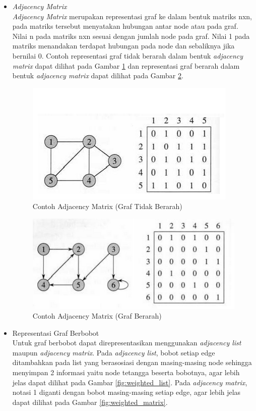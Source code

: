 \begin{itemize}
  \item \textit{Adjacency Matrix}\\
  \textit{Adjacency Matrix} merupakan representasi graf ke dalam bentuk matriks
  nxn, pada matriks tersebut menyatakan hubungan antar node atau pada graf.
  Nilai n pada matriks nxn sesuai dengan jumlah node pada graf. Nilai 1 pada
  matriks menandakan terdapat hubungan pada node dan sebaliknya jika bernilai
  0. Contoh representasi graf tidak berarah dalam bentuk \textit{adjacency
  matrix} dapat dilihat pada Gambar \ref{fig:adjmat_undirec} dan representasi
  graf berarah dalam bentuk \textit{adjacency matrix} dapat dilihat pada Gambar
  \ref{fig:adjmat_direc}.
  
\begin{figure}[h]
\centering
\includegraphics[scale=1]{Gambar/adjmat_undirec}
\caption[Contoh Adjacency Matrix]{Contoh Adjacency Matrix (Graf Tidak Berarah)}
\label{fig:adjmat_undirec}
\end{figure}

\clearpage
\begin{figure}[h]
\centering
\includegraphics[scale=1]{Gambar/adjmat_direc}
\caption[Contoh Adjacency Matrix]{Contoh Adjacency Matrix (Graf Berarah)}
\label{fig:adjmat_direc}
\end{figure}

  \item Representasi Graf Berbobot \\
  Untuk graf berbobot dapat direpresentasikan menggunakan \textit{adjacency
  list} maupun \textit{adjacency matrix}. Pada \textit{adjacency list},
  bobot setiap edge ditambahkan pada list yang berasosiasi dengan masing-masing
  node sehingga menyimpan 2 informasi yaitu node tetangga beserta bobotnya,
  agar lebih jelas dapat dilihat pada Gambar \ref{fig:weighted_list}. Pada
  \textit{adjacency matrix}, notasi 1 diganti dengan bobot masing-masing setiap 
  edge, agar lebih jelas dapat dilihat pada Gambar \ref{fig:weighted_matrix}.
  

\end{itemize}
